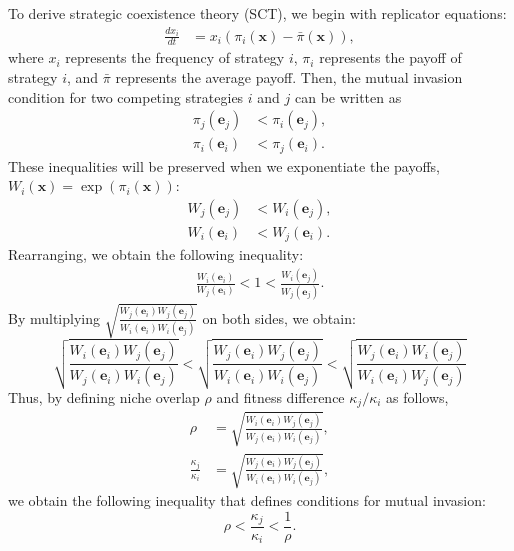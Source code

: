 \documentclass[12pt]{article}
\begin{document}
To derive strategic coexistence theory (SCT), we begin with replicator equations:
\begin{align}
\frac{dx_i}{dt} &= x_i (\pi_i(\mathbf{x}) - \bar{\pi}(\mathbf{x})),
\end{align}
where $x_i$ represents the frequency of strategy $i$, $\pi_i$ represents the payoff of strategy $i$, and $\bar{\pi}$ represents the average payoff.
Then, the mutual invasion condition for two competing strategies $i$ and $j$ can be written as
\begin{align}
\pi_j(\mathbf{e}_j) & <\pi_i(\mathbf{e}_j),\\
\pi_i(\mathbf{e}_i) &< \pi_j(\mathbf{e}_i).
\end{align}
These inequalities will be preserved when we exponentiate the payoffs, $W_i(\mathbf{x}) = \exp(\pi_i(\mathbf{x}))$:
\begin{align}
W_j(\mathbf{e}_j) &< W_i(\mathbf{e}_j),\\
W_i(\mathbf{e}_i) &< W_j(\mathbf{e}_i).
\end{align}
Rearranging, we obtain the following inequality:
\begin{align}
\frac{W_i(\mathbf{e}_i)}{W_j(\mathbf{e}_i)} < 1 < 
\frac{W_i(\mathbf{e}_j)}{W_j(\mathbf{e}_j)}.
\end{align}
By multiplying $\sqrt{\frac{W_j(\mathbf{e}_i)W_j(\mathbf{e}_j) }{W_i(\mathbf{e}_i) W_i(\mathbf{e}_j)}}$ on both sides, we obtain:
\begin{equation}
\sqrt{\frac{W_i(\mathbf{e}_i) W_j(\mathbf{e}_j)}{  W_j(\mathbf{e}_i)W_i(\mathbf{e}_j)}} < 
\sqrt{\frac{W_j(\mathbf{e}_i)W_j(\mathbf{e}_j) }{W_i(\mathbf{e}_i) W_i(\mathbf{e}_j)}}
< 
\sqrt{\frac{W_j(\mathbf{e}_i)W_i(\mathbf{e}_j)}{W_i(\mathbf{e}_i) W_j(\mathbf{e}_j) } }
\end{equation}
Thus, by defining niche overlap $\rho$ and fitness difference $\kappa_j/\kappa_i$ as follows,
\begin{align}
\rho &= \sqrt{\frac{W_i(\mathbf{e}_i) W_j(\mathbf{e}_j)}{W_j(\mathbf{e}_i) W_i(\mathbf{e}_j) }},\\
\frac{\kappa_j}{\kappa_i} &= \sqrt{\frac{W_j(\mathbf{e}_i)W_j(\mathbf{e}_j) }{W_i(\mathbf{e}_i) W_i(\mathbf{e}_j)}},
\end{align}
we obtain the following inequality that defines conditions for mutual invasion:
\begin{equation}
\rho < \frac{\kappa_j}{\kappa_i} < \frac{1}{\rho}.
\end{equation}
\end{document}
